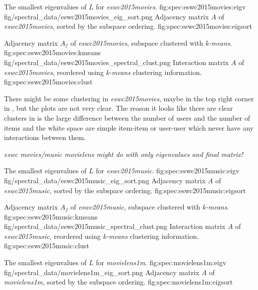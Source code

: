 \FloatBarrier

{The smallest eigenvalues of $L$ for \textit{eswc2015movies}.}
{fig:spec:eswc2015movies:eigv}
{fig/spectral_data/eswc2015movies_eig_sort.png}
{Adjacency matrix $A$ of \textit{eswc2015movies}, sorted by the subspace ordering.}
{fig:spec:eswc2015movies:eigsort}

{Adjacency matrix $A_f$ of \textit{eswc2015movies}, subspace clustered with \textit{k-means}.}
{fig:spec:eswc2015movies:kmeans}
{fig/spectral_data/eswc2015movies_spectral_clust.png}
{Interaction matrix $A$ of \textit{eswc2015movies}, reordered using \textit{k-means} clustering information.}
{fig:spec:eswc2015movies:clust}

\FloatBarrier

There might be some clustering in \textit{eswc2015movies}, maybe in the top right corner in , but the plots are not very clear. The reason it looks like there are clear clusters in  is the large difference between the number of users and the number of items and the white space are simple item-item or user-user which never have any interactions between them.

\textit{eswc movies/music movielens might do with only eigenvalues and final matrix!}

\FloatBarrier

{The smallest eigenvalues of $L$ for \textit{eswc2015music}.}
{fig:spec:eswc2015music:eigv}
{fig/spectral_data/eswc2015music_eig_sort.png}
{Adjacency matrix $A$ of \textit{eswc2015music}, sorted by the subspace ordering.}
{fig:spec:eswc2015music:eigsort}

{Adjacency matrix $A_f$ of \textit{eswc2015music}, subspace clustered with \textit{k-means}.}
{fig:spec:eswc2015music:kmeans}
{fig/spectral_data/eswc2015music_spectral_clust.png}
{Interaction matrix $A$ of \textit{eswc2015music}, reordered using \textit{k-means} clustering information.}
{fig:spec:eswc2015music:clust}

\FloatBarrier

{The smallest eigenvalues of $L$ for \textit{movielens1m}.}
{fig:spec:movielens1m:eigv}
{fig/spectral_data/movielens1m_eig_sort.png}
{Adjacency matrix $A$ of \textit{movielens1m}, sorted by the subspace ordering.}
{fig:spec:movielens1m:eigsort}

